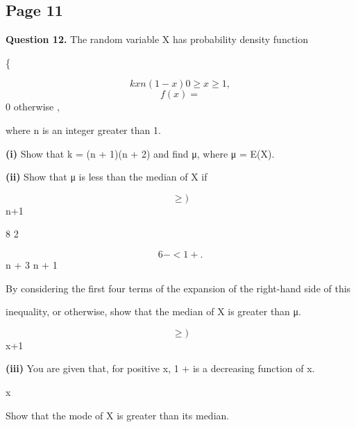 \documentclass[12pt]{article}
\begin{document}
\subsection*{Page 11}
\begin{flushleft}
\bigskip\textbf{Question 12.} The random variable X has probability density function\par
\{\par
\[kx n (1 - x) 0 \geq x \geq 1 ,\]
\[f(x) =\]
0 otherwise ,\par
where n is an integer greater than 1.\par
\textbf{(i)} Show that k = (n + 1)(n + 2) and find μ, where μ = E(X).\par
\textbf{(ii)} Show that μ is less than the median of X if\par
\[\geq )\]
n+1\par
8 2\par
\[6 - < 1 + .\]
n + 3 n + 1\par
By considering the first four terms of the expansion of the right-hand side of this\par
inequality, or otherwise, show that the median of X is greater than μ.\par
\[\geq )\]
x+1\par
\textbf{(iii)} You are given that, for positive x, 1 + is a decreasing function of x.\par
x\par
Show that the mode of X is greater than its median.\par
\end{flushleft}
\end{document}
